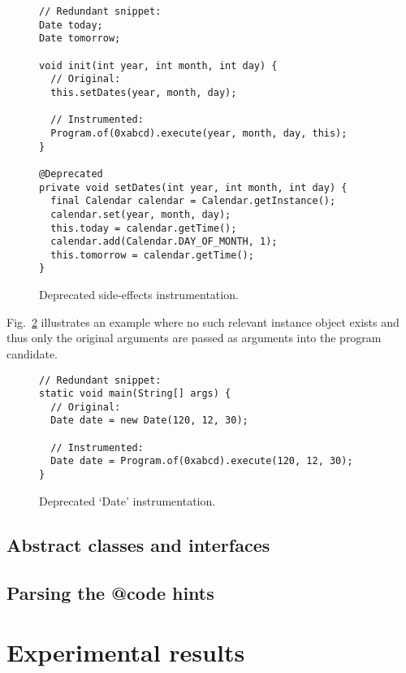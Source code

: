 \documentclass[runningheads,a4paper]{llncs}
\begin{document}
\begin{figure}
\begin{lstlisting}[mathescape=true,showstringspaces=false]
// Redundant snippet:
Date today;
Date tomorrow;
  
void init(int year, int month, int day) {
  // Original:
  this.setDates(year, month, day);

  // Instrumented:
  Program.of(0xabcd).execute(year, month, day, this);
}
  
@Deprecated
private void setDates(int year, int month, int day) {
  final Calendar calendar = Calendar.getInstance();
  calendar.set(year, month, day);
  this.today = calendar.getTime();
  calendar.add(Calendar.DAY_OF_MONTH, 1);
  this.tomorrow = calendar.getTime();
}
\end{lstlisting}
\caption{Deprecated side-effects instrumentation.}
\label{ex:side-effects-instrumentation}
\end{figure}

Fig.~\ref{ex:date-instrumentation} illustrates an example where no
such relevant instance object exists and thus only the original
arguments are passed as arguments into the program candidate.

\begin{figure}
\begin{lstlisting}[mathescape=true,showstringspaces=false]
// Redundant snippet:
static void main(String[] args) {
  // Original:
  Date date = new Date(120, 12, 30);

  // Instrumented:
  Date date = Program.of(0xabcd).execute(120, 12, 30);
}
\end{lstlisting}
\caption{Deprecated `Date' instrumentation.}
\label{ex:date-instrumentation}
\end{figure}

\subsection{Abstract classes and interfaces}


\subsection{Parsing the @code hints}


\section{Experimental results}\label{sec:experimental-results}
\end{document}

